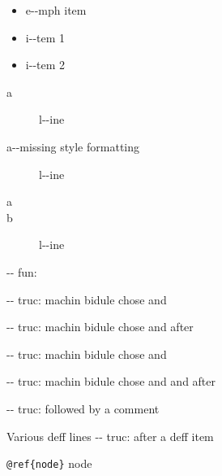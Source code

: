 \documentclass{book}
\begin{document}
\begin{itemize}[label=\emph{} after emph]
\item e{-}{-}mph item
\end{itemize}

\begin{itemize}[label=\textbullet{} a{-}{-}n itemize line]
\item i{-}{-}tem 1
\item i{-}{-}tem 2
\end{itemize}

\begin{description}
\item[a]
l{-}{-}ine
\end{description}

\begin{description}
\item[a{-}{-}missing style formatting]
l{-}{-}ine
\end{description}

\begin{description}
\item[a]
%
%
\item[b]
%
l{-}{-}ine
\end{description}

\hbox{}{-}{-} fun: 


\hbox{}{-}{-} truc: machin bidule chose and


%
\hbox{}{-}{-} truc: machin bidule chose and  after


%
\hbox{}{-}{-} truc: machin bidule chose and 


%
\hbox{}{-}{-} truc: machin bidule chose and and after


%
\hbox{}{-}{-} truc: followed by a comment


%
Various deff lines
\hbox{}{-}{-} truc: after a deff item


%

\texttt{@ref\{node\}} node
\end{document}
